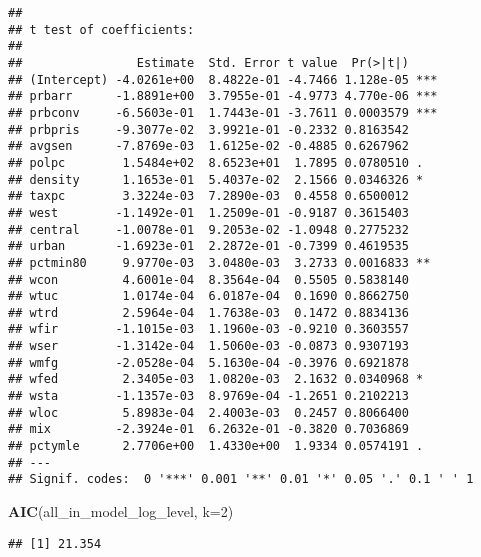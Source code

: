 \documentclass[
]{article}
\newenvironment{Shaded}{\begin{snugshade}}{\end{snugshade}}
\newcommand{\DataTypeTok}[1]{\textcolor[rgb]{0.13,0.29,0.53}{#1}}
\newcommand{\DecValTok}[1]{\textcolor[rgb]{0.00,0.00,0.81}{#1}}
\newcommand{\KeywordTok}[1]{\textcolor[rgb]{0.13,0.29,0.53}{\textbf{#1}}}
\newcommand{\NormalTok}[1]{#1}
\begin{document}
\begin{verbatim}
## 
## t test of coefficients:
## 
##                Estimate  Std. Error t value  Pr(>|t|)    
## (Intercept) -4.0261e+00  8.4822e-01 -4.7466 1.128e-05 ***
## prbarr      -1.8891e+00  3.7955e-01 -4.9773 4.770e-06 ***
## prbconv     -6.5603e-01  1.7443e-01 -3.7611 0.0003579 ***
## prbpris     -9.3077e-02  3.9921e-01 -0.2332 0.8163542    
## avgsen      -7.8769e-03  1.6125e-02 -0.4885 0.6267962    
## polpc        1.5484e+02  8.6523e+01  1.7895 0.0780510 .  
## density      1.1653e-01  5.4037e-02  2.1566 0.0346326 *  
## taxpc        3.3224e-03  7.2890e-03  0.4558 0.6500012    
## west        -1.1492e-01  1.2509e-01 -0.9187 0.3615403    
## central     -1.0078e-01  9.2053e-02 -1.0948 0.2775232    
## urban       -1.6923e-01  2.2872e-01 -0.7399 0.4619535    
## pctmin80     9.9770e-03  3.0480e-03  3.2733 0.0016833 ** 
## wcon         4.6001e-04  8.3564e-04  0.5505 0.5838140    
## wtuc         1.0174e-04  6.0187e-04  0.1690 0.8662750    
## wtrd         2.5964e-04  1.7638e-03  0.1472 0.8834136    
## wfir        -1.1015e-03  1.1960e-03 -0.9210 0.3603557    
## wser        -1.3142e-04  1.5060e-03 -0.0873 0.9307193    
## wmfg        -2.0528e-04  5.1630e-04 -0.3976 0.6921878    
## wfed         2.3405e-03  1.0820e-03  2.1632 0.0340968 *  
## wsta        -1.1357e-03  8.9769e-04 -1.2651 0.2102213    
## wloc         5.8983e-04  2.4003e-03  0.2457 0.8066400    
## mix         -2.3924e-01  6.2632e-01 -0.3820 0.7036869    
## pctymle      2.7706e+00  1.4330e+00  1.9334 0.0574191 .  
## ---
## Signif. codes:  0 '***' 0.001 '**' 0.01 '*' 0.05 '.' 0.1 ' ' 1
\end{verbatim}

\begin{Shaded}
\begin{Highlighting}[]
\KeywordTok{AIC}\NormalTok{(all_in_model_log_level, }\DataTypeTok{k=}\DecValTok{2}\NormalTok{)}
\end{Highlighting}
\end{Shaded}

\begin{verbatim}
## [1] 21.354
\end{verbatim}
\end{document}
